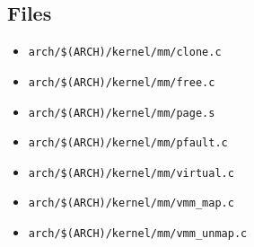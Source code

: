 \subsection{Files}
\begin{itemize}

\item \texttt{arch/\$(ARCH)/kernel/mm/clone.c}
\item \texttt{arch/\$(ARCH)/kernel/mm/free.c}
\item \texttt{arch/\$(ARCH)/kernel/mm/page.s}
\item \texttt{arch/\$(ARCH)/kernel/mm/pfault.c}
\item \texttt{arch/\$(ARCH)/kernel/mm/virtual.c}
\item \texttt{arch/\$(ARCH)/kernel/mm/vmm\_map.c}
\item \texttt{arch/\$(ARCH)/kernel/mm/vmm\_unmap.c}

\end{itemize}
